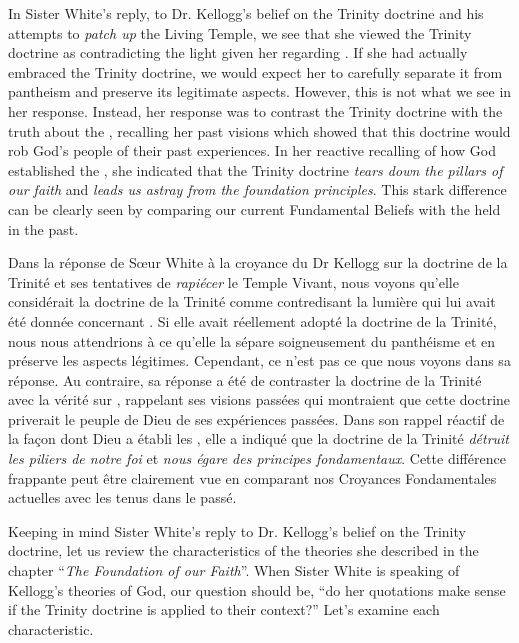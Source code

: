 



In Sister White's reply, to Dr. Kellogg's belief on the Trinity doctrine and his attempts to \textit{patch up} the Living Temple, we see that she viewed the Trinity doctrine as contradicting the light given her regarding . If she had actually embraced the Trinity doctrine, we would expect her to carefully separate it from pantheism and preserve its legitimate aspects. However, this is not what we see in her response. Instead, her response was to contrast the Trinity doctrine with the truth about the , recalling her past visions which showed that this doctrine would rob God's people of their past experiences. In her reactive recalling of how God established the , she indicated that the Trinity doctrine \textit{tears down the pillars of our faith} and \textit{leads us astray from the foundation principles}. This stark difference can be clearly seen by comparing our current Fundamental Beliefs with the  held in the past.


Dans la réponse de Sœur White à la croyance du Dr Kellogg sur la doctrine de la Trinité et ses tentatives de \textit{rapiécer} le Temple Vivant, nous voyons qu'elle considérait la doctrine de la Trinité comme contredisant la lumière qui lui avait été donnée concernant . Si elle avait réellement adopté la doctrine de la Trinité, nous nous attendrions à ce qu'elle la sépare soigneusement du panthéisme et en préserve les aspects légitimes. Cependant, ce n'est pas ce que nous voyons dans sa réponse. Au contraire, sa réponse a été de contraster la doctrine de la Trinité avec la vérité sur , rappelant ses visions passées qui montraient que cette doctrine priverait le peuple de Dieu de ses expériences passées. Dans son rappel réactif de la façon dont Dieu a établi les , elle a indiqué que la doctrine de la Trinité \textit{détruit les piliers de notre foi} et \textit{nous égare des principes fondamentaux}. Cette différence frappante peut être clairement vue en comparant nos Croyances Fondamentales actuelles avec les  tenus dans le passé.


Keeping in mind Sister White’s reply to Dr. Kellogg's belief on the Trinity doctrine, let us review the characteristics of the theories she described in the chapter “\textit{The Foundation of our Faith}”. When Sister White is speaking of Kellogg’s theories of God, our question should be, “do her quotations make sense if the Trinity doctrine is applied to their context?” Let’s examine each characteristic.


